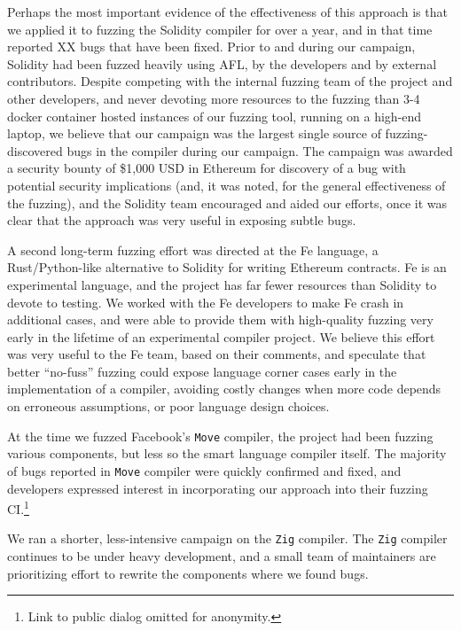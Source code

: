 Perhaps the most important evidence of the effectiveness of this approach is that we applied it to fuzzing the Solidity compiler for over a year, and in that time reported XX bugs that have been fixed.  Prior to and during our campaign, Solidity had been fuzzed heavily using AFL, by the developers and by external contributors.  Despite competing with the internal fuzzing team of the project and other developers, and never devoting more resources to the fuzzing than 3-4 docker container hosted instances of our fuzzing tool, running on a high-end laptop, we believe that our campaign was the largest single source of fuzzing-discovered bugs in the compiler during our campaign.  The campaign was awarded a security bounty of \$1,000 USD in Ethereum for discovery of a bug with potential security implications (and, it was noted, for the general effectiveness of the fuzzing), and the Solidity team encouraged and aided our efforts, once it was clear that the approach was very useful in exposing subtle bugs.

A second long-term fuzzing effort was directed at the Fe language, a Rust/Python-like alternative to Solidity for writing Ethereum contracts.  Fe is an experimental language, and the project has far fewer resources than Solidity to devote to testing.  We worked with the Fe developers to make Fe crash in additional cases, and were able to provide them with high-quality fuzzing very early in the lifetime of an experimental compiler project.  We believe this effort was very useful to the Fe team, based on their comments, and speculate that better ``no-fuss'' fuzzing could expose language corner cases early in the implementation of a compiler, avoiding costly changes when more code depends on erroneous assumptions, or poor language design choices.

At the time we fuzzed Facebook's \texttt{Move} compiler, the project had been fuzzing various components, but less so the smart language compiler itself.
The majority of bugs reported in \texttt{Move} compiler were quickly confirmed and fixed, and developers expressed interest in incorporating our approach into their fuzzing CI.\footnote{Link to public dialog omitted for anonymity.}  %


We ran a shorter, less-intensive campaign on the \texttt{Zig} compiler.  The
\texttt{Zig} compiler continues to be under heavy development, and a small team
of maintainers are prioritizing effort to rewrite the components where we found
bugs.
